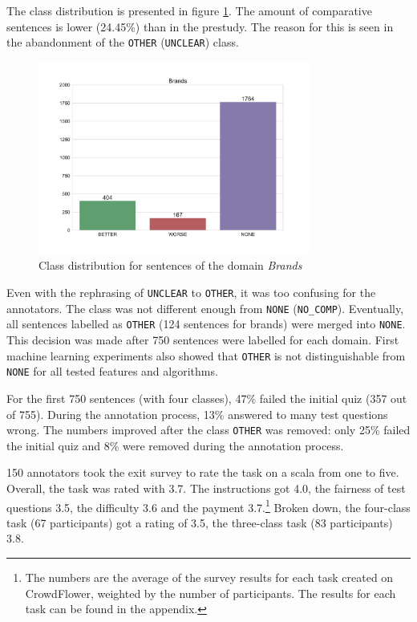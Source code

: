 The class distribution is presented in figure \ref{fig:brands_fin}. The amount of comparative sentences is lower (24.45\%) than in the prestudy. The reason for this is seen in the abandonment of the \texttt{OTHER} (\texttt{UNCLEAR}) class. 

\begin{figure}[h]
\centering
\caption{Class distribution for sentences of the domain \emph{Brands}}
\label{fig:brands_fin}
\includegraphics[width=0.8\textwidth]{images/dataset/Brands-dist}
\end{figure}




Even with the rephrasing of \texttt{UNCLEAR} to \texttt{OTHER}, it was too confusing for the annotators. The class was not different enough from \texttt{NONE} (\texttt{NO\_COMP}). Eventually, all sentences labelled as \texttt{OTHER} (124 sentences for brands) were merged into \texttt{NONE}. This decision was made after 750 sentences were labelled for each domain. First machine learning experiments also showed that \texttt{OTHER} is not distinguishable from \texttt{NONE} for all tested features and algorithms.

For the first 750 sentences (with four classes), 47\% failed the initial quiz (357 out of 755). During the annotation process, 13\% answered to many test questions wrong. The numbers improved after the class \texttt{OTHER} was removed: only 25\% failed the initial quiz and 8\% were removed during the annotation process.

150 annotators took the exit survey to rate the task on a scala from one to five. Overall, the task was rated with 3.7. The instructions got 4.0, the fairness of test questions 3.5, the difficulty 3.6 and the payment 3.7.\footnote{The numbers are the average of the survey results for each task created on CrowdFlower, weighted by the number of participants. The results for each task can be found in the appendix.} Broken down, the four-class task (67 participants) got a rating of 3.5, the three-class task (83 participants) 3.8.


